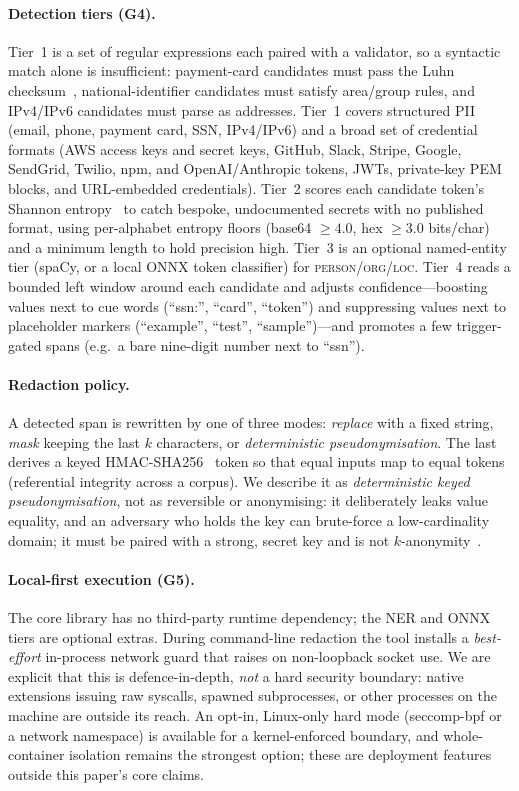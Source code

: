 \documentclass[runningheads]{llncs}
\begin{document}
\paragraph{Detection tiers (G4).}
Tier~1 is a set of regular expressions each paired with a validator, so a
syntactic match alone is insufficient: payment-card candidates must pass the
Luhn checksum~\cite{luhn}, national-identifier candidates must satisfy
area/group rules, and IPv4/IPv6 candidates must parse as addresses. Tier~1
covers structured PII (email, phone, payment card, SSN, IPv4/IPv6) and a broad
set of credential formats (AWS access keys and secret keys, GitHub, Slack,
Stripe, Google, SendGrid, Twilio, npm, and OpenAI/Anthropic tokens, JWTs,
private-key PEM blocks, and URL-embedded credentials). Tier~2 scores each
candidate token's Shannon entropy~\cite{shannon} to catch bespoke,
undocumented secrets with no published format, using per-alphabet entropy floors
(base64 $\ge 4.0$, hex $\ge 3.0$ bits/char) and a minimum length to hold
precision high. Tier~3 is an optional named-entity tier (spaCy, or a local ONNX
token classifier) for \textsc{person}/\textsc{org}/\textsc{loc}. Tier~4 reads a
bounded left window around each candidate and adjusts confidence---boosting
values next to cue words (``ssn:'', ``card'', ``token'') and suppressing values
next to placeholder markers (``example'', ``test'', ``sample'')---and promotes a
few trigger-gated spans (e.g.\ a bare nine-digit number next to ``ssn'').

\paragraph{Redaction policy.}
A detected span is rewritten by one of three modes: \emph{replace} with a fixed
string, \emph{mask} keeping the last $k$ characters, or \emph{deterministic
pseudonymisation}. The last derives a keyed HMAC-SHA256~\cite{hmac} token so that
equal inputs map to equal tokens (referential integrity across a corpus). We
describe it as \emph{deterministic keyed pseudonymisation}, not as reversible or
anonymising: it deliberately leaks value equality, and an adversary who holds the
key can brute-force a low-cardinality domain; it must be paired with a strong,
secret key and is not $k$-anonymity~\cite{kanonymity}.

\paragraph{Local-first execution (G5).}
The core library has no third-party runtime dependency; the NER and ONNX tiers
are optional extras. During command-line redaction the tool installs a
\emph{best-effort} in-process network guard that raises on non-loopback socket
use. We are explicit that this is defence-in-depth, \emph{not} a hard security
boundary: native extensions issuing raw syscalls, spawned subprocesses, or other
processes on the machine are outside its reach. An opt-in, Linux-only hard mode
(seccomp-bpf or a network namespace) is available for a kernel-enforced boundary,
and whole-container isolation remains the strongest option; these are deployment
features outside this paper's core claims.
\end{document}
